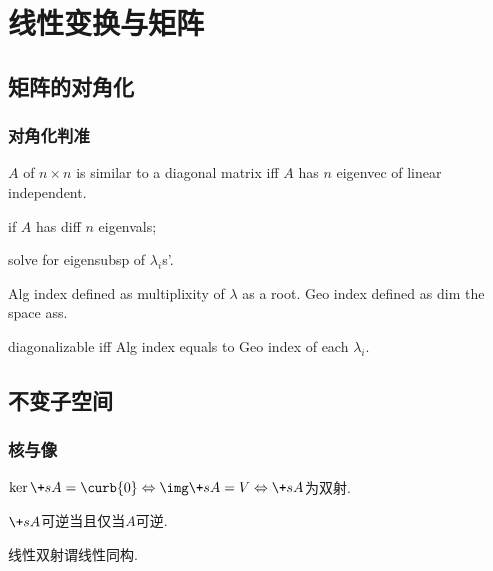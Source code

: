 \documentclass[hidelinks]{ctexart}
\begin{document}

\section{线性变换与矩阵} %
\label{sec:线性变换与矩阵}

\subsection{矩阵的对角化} %
\label{sub:矩阵的对角化}

\subsubsection{对角化判准} %
\label{ssub:对角化判准}

\begin{finale}
    $A$ of $n\times n$ is similar to a diagonal matrix iff $A$ has $n$ eigenvec of linear independent.
\end{finale}
\begin{corollary}
    \begin{cenum}
        \item if $A$ has diff $n$ eigenvals;
        \item solve for eigensubsp of $\lambda_i$s'.
    \end{cenum}
\end{corollary}
Alg index defined as multiplixity of $\lambda$ as a root. Geo index defined as dim the space ass.
\begin{finale}
    diagonalizable iff Alg index equals to Geo index of each $\lambda_i$.
\end{finale}



\subsection{不变子空间} %
\label{sub:不变子空间}

\subsubsection{核与像} %
\label{ssub:核与像}

\begin{proposition}
    $\ker\+sA=\curb{0}\Leftrightarrow \img\+sA = V \Leftrightarrow \+sA$为双射.
\end{proposition}
\begin{proposition}
    $\+sA$可逆当且仅当$A$可逆.
\end{proposition}
\begin{definition}
    [线性同构]线性双射谓线性同构.
\end{definition}



\end{document}
